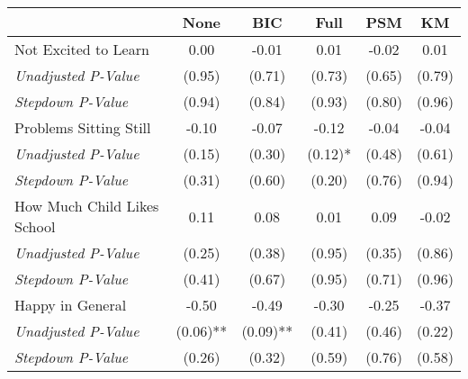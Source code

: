 \begin{tabular}{l c c c c c}
\toprule
 & None & BIC & Full & PSM & KM \\
\midrule
Not Excited to Learn & 0.00 & -0.01 & 0.01 & -0.02 & 0.01 \\
\quad \textit{Unadjusted P-Value} & (0.95) & (0.71) & (0.73) & (0.65) & (0.79) \\
\quad \textit{Stepdown P-Value} & (0.94) & (0.84) & (0.93) & (0.80) & (0.96) \\
Problems Sitting Still & -0.10 & -0.07 & -0.12 & -0.04 & -0.04 \\
\quad \textit{Unadjusted P-Value} & (0.15) & (0.30) & (0.12)* & (0.48) & (0.61) \\
\quad \textit{Stepdown P-Value} & (0.31) & (0.60) & (0.20) & (0.76) & (0.94) \\
How Much Child Likes School & 0.11 & 0.08 & 0.01 & 0.09 & -0.02 \\
\quad \textit{Unadjusted P-Value} & (0.25) & (0.38) & (0.95) & (0.35) & (0.86) \\
\quad \textit{Stepdown P-Value} & (0.41) & (0.67) & (0.95) & (0.71) & (0.96) \\
Happy in General & -0.50 & -0.49 & -0.30 & -0.25 & -0.37 \\
\quad \textit{Unadjusted P-Value} & (0.06)** & (0.09)** & (0.41) & (0.46) & (0.22) \\
\quad \textit{Stepdown P-Value} & (0.26) & (0.32) & (0.59) & (0.76) & (0.58) \\
\bottomrule
\end{tabular}
